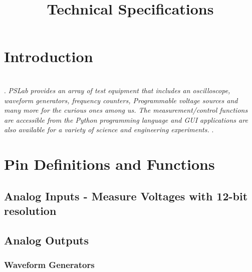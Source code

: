 \documentclass[11pt,article,sans]{moderncv} %
\title{Technical Specifications}
\begin{document}
\makecvtitle %




\chapter{\color{blue!50!green}\LARGE\bfseries Introduction}
\vspace{5mm}
\\.
\setlength{\parindent}{1cm}
\textit{\color{blue!20!black!80}PSLab provides an array of test equipment that includes an oscilloscope, waveform generators, frequency counters, Programmable voltage sources and many more for the curious ones among us. The measurement/control functions are accessible from the Python programming language and GUI applications are also available for a variety of science and engineering experiments. } .\\
\setlength{\parindent}{0cm}





\vspace{20pt}
\chapter{\color{blue!50!green}\LARGE\bfseries Pin Definitions and Functions}
\section{Analog Inputs - Measure Voltages with 12-bit resolution}

\section{Analog Outputs}
\subsection{Waveform Generators}
\end{document}
